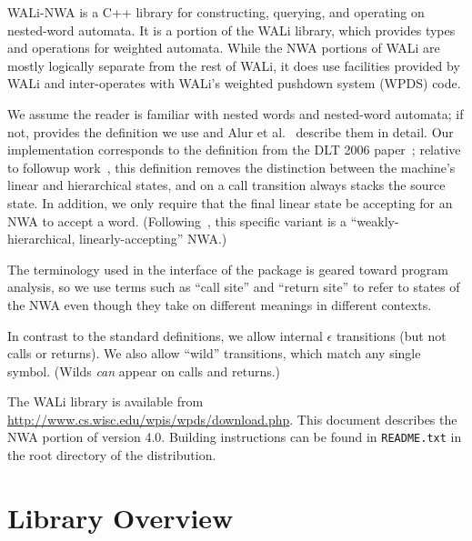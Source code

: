 WALi-NWA is a C++ library for constructing, querying, and operating on
nested-word automata.  It is a portion of the WALi library, which provides
types and operations for weighted automata.
While the NWA portions of WALi
are mostly logically separate from the rest of WALi, it does use
facilities provided by WALi and inter-operates with WALi's weighted pushdown
system (WPDS) code.

We assume the reader is familiar with nested words and
nested-word automata; if not,  provides the definition
we use and
Alur et al.~\cite{DLT:AM2006,JACM:AM2009} describe them in detail. Our
implementation corresponds to the definition from the DLT 2006
paper~\cite{DLT:AM2006}; relative to followup work~\cite{JACM:AM2009}, this definition removes
the distinction between the machine's linear and hierarchical states, and on
a call transition always stacks the source state. In addition, we only require that the
final linear state be accepting for an NWA to accept a
word. (Following~\cite{JACM:AM2009}, this specific variant is a
``weakly-hierarchical, linearly-accepting'' NWA.)

The terminology used in the interface of the package is geared
toward program analysis, so we use terms such as ``call site'' and ``return
site'' to refer to states of the NWA even though they take on different
meanings in different contexts.

In contrast to the standard definitions, we allow internal $\epsilon$
transitions (but not calls or returns). We also allow ``wild''
transitions, which match any single symbol. (Wilds \emph{can} appear on calls
and returns.)


The WALi library is available from
\url{http://www.cs.wisc.edu/wpis/wpds/download.php}. This document describes
the NWA portion of version 4.0. Building instructions can be found in
\texttt{README.txt} in the root directory of the distribution.

\clearpage
\tableofcontents
\clearpage

\section{Library Overview}
\label{Se:Nested Word Automata}

